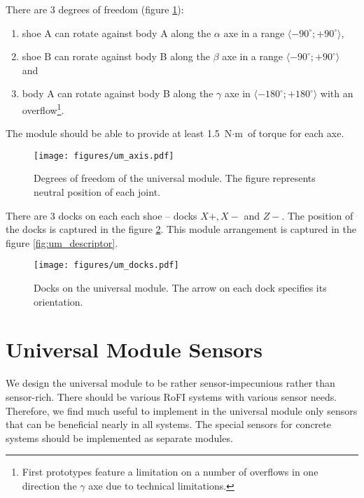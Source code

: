 There are 3 degrees of freedom (figure \ref{fig:um_axis}):
\begin{enumerate}
    \item shoe A can rotate against body A along the $\alpha$ axe in a range
    $\langle -90^\circ; +90^\circ\rangle$,
    \item shoe B can rorate against body B along the $\beta$ axe in a range
    $\langle -90^\circ; +90^\circ\rangle$ and
    \item body A can rotate against body B along the $\gamma$ axe in $\langle
    -180^\circ; +180^\circ\rangle$ with an overflow\footnote{First prototypes
    feature a limitation on a number of overflows in one direction the $\gamma$
    axe due to technical limitations. }.
\end{enumerate}
The module should be able to provide at least 1.5 $\text{N}\cdot\text{m}$ of
torque for each axe.

\begin{figure}
    \centering
    \texttt{[image: figures/um\_axis.pdf]}
    \caption{Degrees of freedom of the universal module. The figure represents neutral position of each joint.}
    \label{fig:um_axis}
\end{figure}

There are 3 docks on each each shoe -- docks $X+, X-$ and $Z-$. The position of
the docks is captured in the figure \ref{fig:um_docks}. This module arrangement
is captured in the figure \ref{fig:um_descriptor}.

\begin{figure}
    \centering
    \texttt{[image: figures/um\_docks.pdf]}
    \caption{Docks on the universal module. The arrow on each dock specifies its orientation.}
    \label{fig:um_docks}
\end{figure}


\section{Universal Module Sensors}

We design the universal module to be rather sensor-impecunious rather than
sensor-rich. There should be various RoFI systems with various sensor needs.
Therefore, we find much useful to implement in the universal module only sensors
that can be beneficial nearly in all systems. The special sensors for concrete
systems should be implemented as separate modules.

